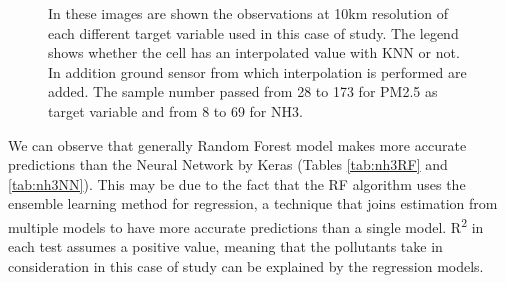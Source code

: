 \begin{figure}[H] 
    \centering
    \hfill%
    \caption{In these images are shown the observations at 10km resolution of each different target variable used in this case of study. The legend shows whether the cell has an interpolated value with KNN or not. In addition ground sensor from which interpolation is performed are added. 
    The sample number passed from 28 to 173 for PM2.5 as target variable and from 8 to 69 for NH3.}
    \label{fig:comparison-sensors}
\end{figure}

We can observe that generally Random Forest model makes more accurate predictions than the Neural Network by Keras (Tables \ref{tab:nh3RF} and \ref{tab:nh3NN}). This may be due to the fact that the RF algorithm uses the ensemble learning method for regression, a technique that joins estimation from multiple models to have more accurate predictions than a single model. 
R\textsuperscript{2} in each test assumes a positive value, meaning that the pollutants take in consideration in this case of study can be explained by the regression models. 
